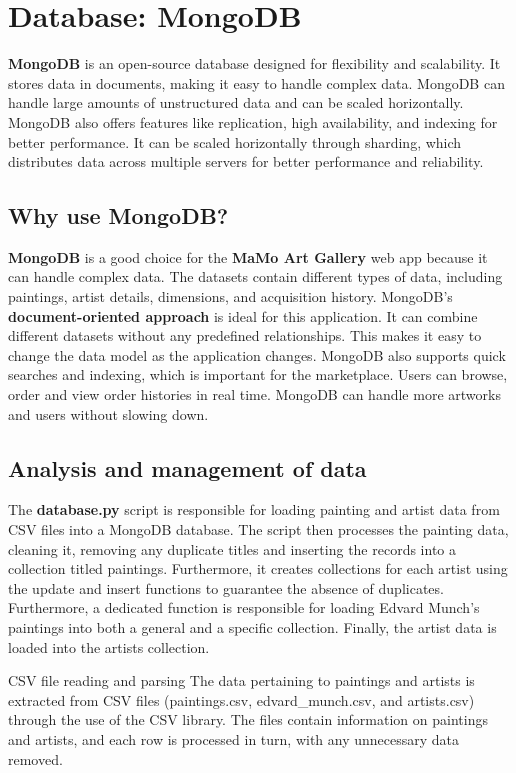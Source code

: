 \documentclass[a4paper,12pt]{article}
\begin{document}
\newpage
\section{Database: MongoDB}
\justify

\textbf{MongoDB} is an open-source database designed for flexibility and scalability. It stores data in documents, making it easy to handle complex data. MongoDB can handle large amounts of unstructured data and can be scaled horizontally. MongoDB also offers features like replication, high availability, and indexing for better performance. It can be scaled horizontally through sharding, which distributes data across multiple servers for better performance and reliability.


\subsection{Why use MongoDB?}
\justify
\textbf{MongoDB} is a good choice for the \textbf{MaMo Art Gallery} web app because it can handle complex data. The datasets contain different types of data, including paintings, artist details, dimensions, and acquisition history. MongoDB's \textbf{document-oriented approach} is ideal for this application. It can combine different datasets without any predefined relationships. This makes it easy to change the data model as the application changes.
MongoDB also supports quick searches and indexing, which is important for the marketplace. Users can browse, order and view order histories in real time. MongoDB can handle more artworks and users without slowing down.

\subsection{Analysis and management of data}
\justify

The \textbf{database.py} script is responsible for loading painting and artist data from CSV files into a MongoDB database. The script then processes the painting data, cleaning it, removing any duplicate titles and inserting the records into a collection titled paintings. Furthermore, it creates collections for each artist using the update and insert functions to guarantee the absence of duplicates. Furthermore, a dedicated function is responsible for loading Edvard Munch's paintings into both a general and a specific collection. Finally, the artist data is loaded into the artists collection.

CSV file reading and parsing
The data pertaining to paintings and artists is extracted from CSV files (paintings.csv, edvard_munch.csv, and artists.csv) through the use of the CSV library. The files contain information on paintings and artists, and each row is processed in turn, with any unnecessary data removed.
\end{document}
